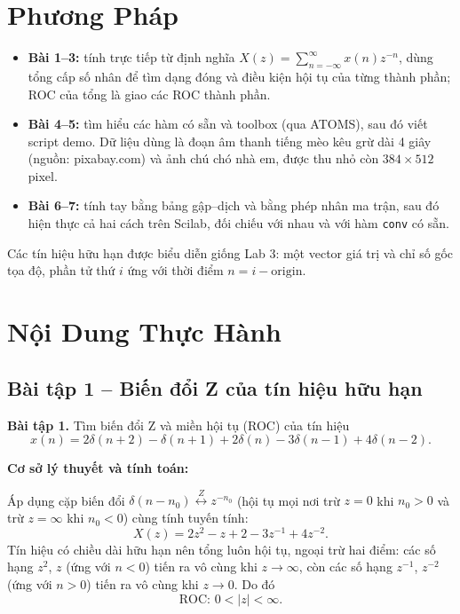 \documentclass[12pt,a4paper]{article}
\begin{document}
\section{Phương Pháp}
\begin{itemize}
    \item \textbf{Bài 1--3:} tính trực tiếp từ định nghĩa $X(z) = \sum_{n=-\infty}^{\infty} x(n) z^{-n}$, dùng tổng cấp số nhân để tìm dạng đóng và điều kiện hội tụ của từng thành phần; ROC của tổng là giao các ROC thành phần.
    \item \textbf{Bài 4--5:} tìm hiểu các hàm có sẵn và toolbox (qua ATOMS), sau đó viết script demo. Dữ liệu dùng là đoạn âm thanh tiếng mèo kêu grừ dài 4 giây (nguồn: pixabay.com) và ảnh chú chó nhà em, được thu nhỏ còn $384 \times 512$ pixel.
    \item \textbf{Bài 6--7:} tính tay bằng bảng gập--dịch và bằng phép nhân ma trận, sau đó hiện thực cả hai cách trên Scilab, đối chiếu với nhau và với hàm \texttt{conv} có sẵn.
\end{itemize}
Các tín hiệu hữu hạn được biểu diễn giống Lab 3: một vector giá trị và chỉ số gốc tọa độ, phần tử thứ $i$ ứng với thời điểm $n = i - \text{origin}$.

\section{Nội Dung Thực Hành}

\subsection{Bài tập 1 -- Biến đổi Z của tín hiệu hữu hạn}
\begin{mdframed}[style=exbox]
\noindent\textbf{Bài tập 1.} Tìm biến đổi Z và miền hội tụ (ROC) của tín hiệu
\[
    x(n) = 2\delta(n+2) - \delta(n+1) + 2\delta(n) - 3\delta(n-1) + 4\delta(n-2).
\]
\end{mdframed}

\noindent\textbf{Cơ sở lý thuyết và tính toán:}

Áp dụng cặp biến đổi $\delta(n - n_0) \overset{Z}{\longleftrightarrow} z^{-n_0}$ (hội tụ mọi nơi trừ $z = 0$ khi $n_0 > 0$ và trừ $z = \infty$ khi $n_0 < 0$) cùng tính tuyến tính:
\begin{equation}
    X(z) = 2z^{2} - z + 2 - 3z^{-1} + 4z^{-2}.
\end{equation}
Tín hiệu có chiều dài hữu hạn nên tổng luôn hội tụ, ngoại trừ hai điểm: các số hạng $z^{2}$, $z$ (ứng với $n < 0$) tiến ra vô cùng khi $z \to \infty$, còn các số hạng $z^{-1}$, $z^{-2}$ (ứng với $n > 0$) tiến ra vô cùng khi $z \to 0$. Do đó
\[
    \text{ROC: } 0 < |z| < \infty.
\]
\end{document}
